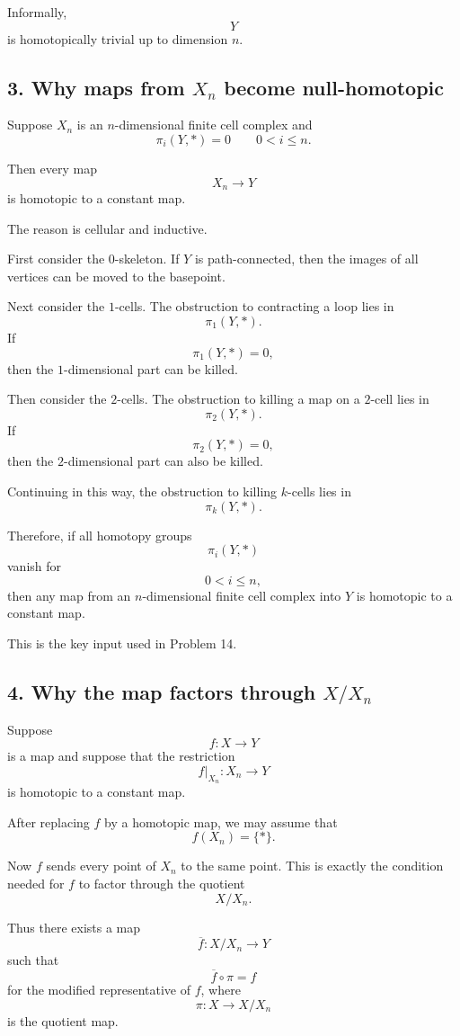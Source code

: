 \documentclass[12pt,a4paper]{article}
\theoremstyle{notespace}
\begin{document}
Informally,
\[
Y
\]
is homotopically trivial up to dimension \(n\).

\subsection*{3. Why maps from \(X_n\) become null-homotopic}

Suppose \(X_n\) is an \(n\)-dimensional finite cell complex and
\[
\pi_i(Y,*)=0
\qquad
0<i\leq n.
\]

Then every map
\[
X_n\to Y
\]
is homotopic to a constant map.

The reason is cellular and inductive.

First consider the \(0\)-skeleton. If \(Y\) is path-connected, then the images of all vertices can be moved to the basepoint.

Next consider the \(1\)-cells. The obstruction to contracting a loop lies in
\[
\pi_1(Y,*).
\]
If
\[
\pi_1(Y,*)=0,
\]
then the \(1\)-dimensional part can be killed.

Then consider the \(2\)-cells. The obstruction to killing a map on a \(2\)-cell lies in
\[
\pi_2(Y,*).
\]
If
\[
\pi_2(Y,*)=0,
\]
then the \(2\)-dimensional part can also be killed.

Continuing in this way, the obstruction to killing \(k\)-cells lies in
\[
\pi_k(Y,*).
\]

Therefore, if all homotopy groups
\[
\pi_i(Y,*)
\]
vanish for
\[
0<i\leq n,
\]
then any map from an \(n\)-dimensional finite cell complex into \(Y\) is homotopic to a constant map.

This is the key input used in Problem 14.

\subsection*{4. Why the map factors through \(X/X_n\)}

Suppose
\[
f:X\to Y
\]
is a map and suppose that the restriction
\[
f|_{X_n}:X_n\to Y
\]
is homotopic to a constant map.

After replacing \(f\) by a homotopic map, we may assume that
\[
f(X_n)=\{*\}.
\]

Now \(f\) sends every point of \(X_n\) to the same point. This is exactly the condition needed for \(f\) to factor through the quotient
\[
X/X_n.
\]

Thus there exists a map
\[
\overline f:X/X_n\to Y
\]
such that
\[
\overline f\circ \pi=f
\]
for the modified representative of \(f\), where
\[
\pi:X\to X/X_n
\]
is the quotient map.
\end{document}

